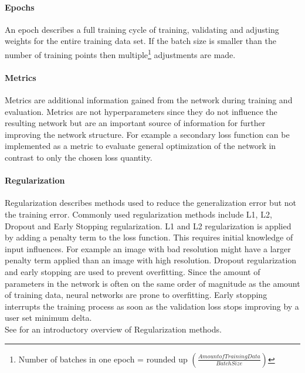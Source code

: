 		\paragraph{Epochs}
			An epoch describes a full training cycle of training, validating and adjusting weights for the entire training data set. If the batch size is smaller than the number of training points then multiple\footnote{Number of batches in one epoch = rounded up $\left(\frac{Amount of Training Data}{Batch Size}\right)$} adjustments are made.%
		\paragraph{Metrics}
			Metrics are additional information gained from the network during training and evaluation. Metrics are not hyperparameters since they do not influence the resulting network but are an important source of information for further improving the network structure. For example a secondary loss function can be implemented as a metric to evaluate general optimization of the network in contrast to only the chosen loss quantity. 
		\paragraph{Regularization}
			Regularization describes methods used to reduce the generalization error but not the training error. Commonly used regularization methods include L1, L2, Dropout and Early Stopping regularization. L1 and L2 regularization is applied by adding a penalty term to the loss function. This requires initial knowledge of input influences. For example an image with bad resolution might have a larger penalty term applied than an image with high resolution. Dropout regularization and early stopping are used to prevent overfitting. Since the amount of parameters in the network is often on the same order of magnitude as the amount of training data, neural networks are prone to overfitting. Early stopping interrupts the training process as soon as the validation loss stops improving by a user set minimum delta.\\
			See \cite{RegIntro} for an introductory overview of Regularization methods.
